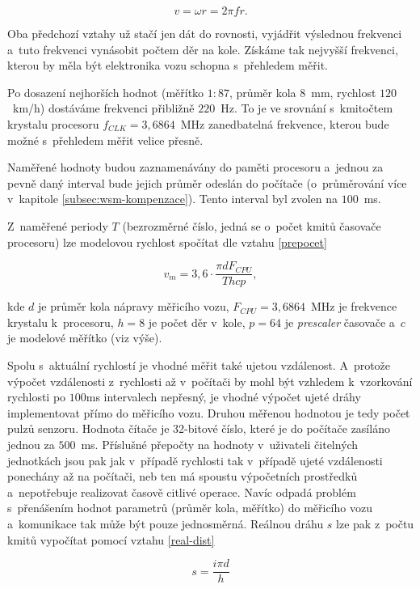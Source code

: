 $$v = \omega r = 2 \pi f r.$$

Oba předchozí vztahy už stačí jen dát do rovnosti, vyjádřit výslednou frekvenci
a~tuto frekvenci vynásobit počtem děr na kole. Získáme tak nejvyšší frekvenci,
kterou by měla být elektronika vozu schopna s~přehledem měřit.

Po dosazení nejhorších hodnot (měřítko $1:87$, průměr kola $8$~mm, rychlost
$120$~km/h) dostáváme frekvenci přibližně $220$~Hz. To je ve srovnání
s~kmitočtem krystalu procesoru $f_{CLK} = 3,6864$~MHz zanedbatelná frekvence,
kterou bude možné s~přehledem měřit velice přesně.

Naměřené hodnoty budou zaznamenávány do paměti procesoru a~jednou za pevně daný
interval bude jejich průměr odeslán do počítače (o~průměrování více v~kapitole
\ref{subsec:wsm-kompenzace}). Tento interval byl zvolen na $100$~ms.

Z~naměřené periody $T$ (bezrozměrné číslo, jedná se o~počet kmitů časovače
procesoru) lze modelovou rychlost spočítat dle vztahu
\ref{prepocet}

\begin{equation}
v_m = 3,6 \cdot \frac{\pi d F_{CPU}}{T h c p},
\label{prepocet}
\end{equation}

kde $d$ je průměr kola nápravy měřicího vozu, $F_{CPU} = 3,6864$~MHz je
frekvence krystalu k~procesoru, $h = 8$ je počet děr v~kole, $p = 64$ je
\textit{prescaler} časovače a~$c$ je modelové měřítko (viz výše).

Spolu s~aktuální rychlostí je vhodné měřit také ujetou vzdálenost. A~protože
výpočet vzdálenosti z~rychlosti až v~počítači by mohl být vzhledem k~vzorkování
rychlosti po $100$ms intervalech nepřesný, je vhodné výpočet ujeté dráhy
implementovat přímo do měřicího vozu. Druhou měřenou hodnotou je tedy počet
pulzů senzoru. Hodnota čítače je 32-bitové číslo, které je do počítače zasíláno
jednou za $500$~ms. Příslušné přepočty na hodnoty v~uživateli čitelných
jednotkách jsou pak jak v~případě rychlosti tak v~případě ujeté vzdálenosti
ponechány až na počítači, neb ten má spoustu výpočetních prostředků
a~nepotřebuje realizovat časově citlivé operace. Navíc odpadá problém
s~přenášením hodnot parametrů (průměr kola, měřítko) do měřicího vozu
a~komunikace tak může být pouze jednosměrná. Reálnou dráhu $s$ lze pak z~počtu
kmitů vypočítat pomocí vztahu \ref{real-dist}

\begin{equation}
s = \frac{i \pi d}{h}
\label{real-dist}
\end{equation}


